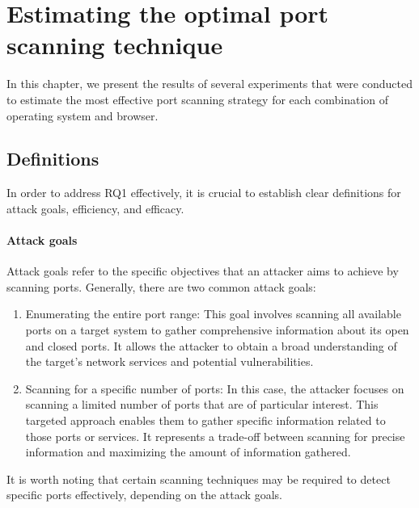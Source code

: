 \chapter{Estimating the optimal port scanning technique}
\label{chapter:scanning-techniques-experiment}

In this chapter, we present the results of several experiments that were conducted to estimate the most effective port scanning strategy for each combination of operating system and browser. 

\section{Definitions}

In order to address RQ1 effectively, it is crucial to establish clear definitions for attack goals, efficiency, and efficacy.

\subsubsection{Attack goals}

Attack goals refer to the specific objectives that an attacker aims to achieve by scanning ports. Generally, there are two common attack goals:

\begin{enumerate}[label=\alph*.]
    \item Enumerating the entire port range: This goal involves scanning all available ports on a target system to gather comprehensive information about its open and closed ports. It allows the attacker to obtain a broad understanding of the target's network services and potential vulnerabilities.
    
    \item Scanning for a specific number of ports: In this case, the attacker focuses on scanning a limited number of ports that are of particular interest. This targeted approach enables them to gather specific information related to those ports or services. It represents a trade-off between scanning for precise information and maximizing the amount of information gathered.
\end{enumerate}

It is worth noting that certain scanning techniques may be required to detect specific ports effectively, depending on the attack goals.

